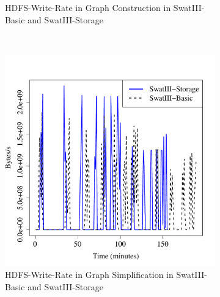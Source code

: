 \documentclass[conference]{IEEEtran}
\begin{document}
\begin{figure}[htb]
\begin{subfigure}[b]{0.3\textwidth}
                \caption{HDFS-Write-Rate in Graph Construction in SwatIII-Basic and SwatIII-Storage}
                \label{fig:BGHddSsdHdfsWrIops}
        \end{subfigure}
        ~ %
        \begin{subfigure}[b]{0.3\textwidth}
                \includegraphics[width=\textwidth]{Figure/SystemData/Plots/ECHddSsdHdfsWrIops.pdf}
                \caption{HDFS-Write-Rate in Graph Simplification in SwatIII-Basic and SwatIII-Storage}
                \label{fig:ECHddSsdHdfsWrIops}
        \end{subfigure}
        ~ %
        \begin{subfigure}[b]{0.3\textwidth}

\end{subfigure}
\end{figure}
\end{document}
